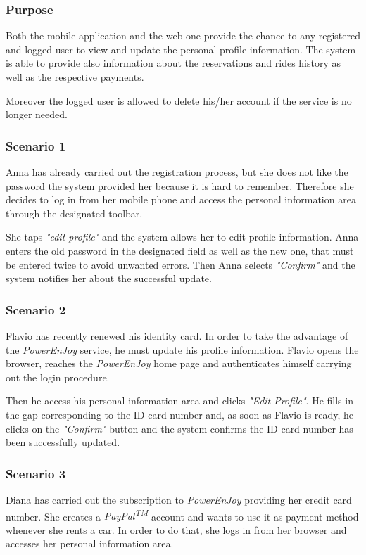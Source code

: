 \subsubsection{Purpose}
Both the mobile application and the web one provide the chance to any registered and logged user to view and update the personal profile information. The system is able to provide also information about the reservations and rides history as well as the respective payments.

Moreover the logged user is allowed to delete his/her account if the service is no longer needed.

\subsubsection{Scenario 1}
Anna has already carried out the registration process, but she does not like the password the system provided her because it is hard to remember. Therefore she decides to log in from her mobile phone and access the personal information area through the designated toolbar.

She taps \emph{"edit profile"} and the system allows her to edit profile information. Anna enters the old password in the designated field as well as the new one, that must be entered twice to avoid unwanted errors. Then Anna selects \emph{"Confirm"} and the system notifies her about the successful update.

\subsubsection{Scenario 2}
Flavio has recently renewed his identity card. In order to take the advantage of the \emph{PowerEnJoy} service, he must update his profile information. Flavio opens the browser, reaches the \emph{PowerEnJoy} home page and authenticates himself carrying out the login procedure. 

Then he access his personal information area and clicks \emph{"Edit Profile"}. He fills in the gap corresponding to the ID card number and, as soon as Flavio is ready, he clicks on the \emph{"Confirm"} button and the system confirms the ID card number has been successfully updated.

\subsubsection{Scenario 3}
Diana has carried out the subscription to \emph{PowerEnJoy} providing her credit card number. She creates a \emph{PayPal\textsuperscript{TM}} account and wants to use it as payment method whenever she rents a car. In order to do that, she logs in from her browser and accesses her personal information area.

